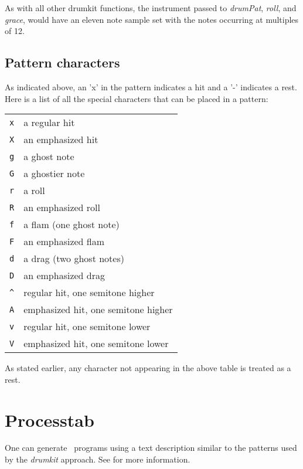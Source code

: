 \documentclass{article}
\begin{document}
As with all other drumkit functions,
the instrument passed to {\it drumPat}, {\it roll}, and {\it grace},
would have an eleven note sample set with the
notes occurring at multiples of 12.

\subsection*{Pattern characters}

As indicated above, an 'x' in the pattern indicates a hit and a '-' indicates
a rest. Here is a list of all the special characters that can be placed in
a pattern:

\begin{center}
\begin{tabular}{ll}%
\verb!x! & a regular hit \\
\verb!X! & an emphasized hit \\
\verb!g! & a ghost note \\
\verb!G! & a ghostier note \\
\verb!r! & a roll \\
\verb!R! & an emphasized roll \\
\verb!f! & a flam (one ghost note) \\
\verb!F! & an emphasized flam \\
\verb!d! & a drag (two ghost notes) \\
\verb!D! & an emphasized drag \\
\verb!^! & regular hit, one semitone higher \\
\verb!A! & emphasized hit, one semitone higher \\
\verb!v! & regular hit, one semitone lower \\
\verb!V! & emphasized hit, one semitone lower \\
\end{tabular}
\end{center}

As stated earlier, any character not appearing in the above table is
treated as a rest.

\section*{Processtab}

One can generate \songlib\ programs using a text description similar to
the patterns used by the {\it drumkit} approach. See 
for more information.
\end{document}
